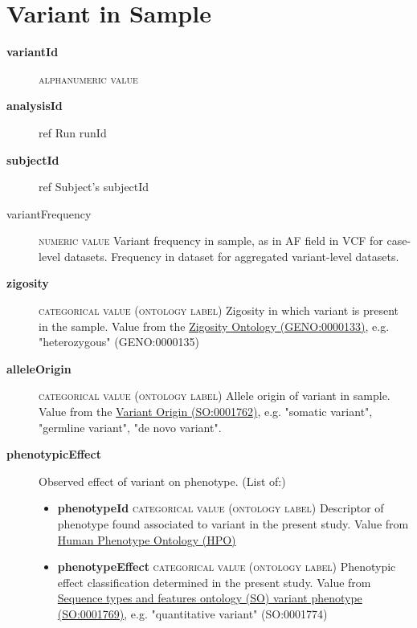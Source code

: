 \documentclass[a4paper, 10pt]{article}        %
\begin{document}
 
 
   \section*{ {\color{teal} Variant in Sample}}
  
  \begin{description}
  	\item[\textbf{variantId}]  {\textsc{alphanumeric value}} 
	\item[\textbf{analysisId}] ref Run runId
	\item[\textbf{subjectId}] ref Subject's subjectId
	\item[variantFrequency] {\textsc{numeric value}} Variant frequency in sample, as in AF field in VCF for case-level datasets. Frequency in dataset for aggregated variant-level datasets.
	\item[\textbf{zigosity}] {\textsc{categorical value (ontology label)}} Zigosity in which variant is present in the sample. Value from the \href{https://github.com/monarch-initiative/GENO-ontology/}{Zigosity Ontology (GENO:0000133)}, e.g. "heterozygous" (GENO:0000135)
	\item[\textbf{alleleOrigin}] {\textsc{categorical value (ontology label)}} Allele origin of variant in sample. Value from the \href{http://purl.obolibrary.org/obo/SO_0001762}{Variant Origin (SO:0001762)}, e.g. "somatic variant", "germline variant", "de novo variant". %
	\item[\textbf{phenotypicEffect}] Observed effect of variant on phenotype. (List of:)
	\begin{itemize}
				\item[] \textbf{phenotypeId} {\textsc{categorical value (ontology label)}} Descriptor of phenotype found associated to variant in the present study. Value from \href{http:purl.obolibrary.org/obo/HP_0000001}{Human Phenotype Ontology (HPO)}
				\item[] \textbf{phenotypeEffect} {\textsc{categorical value (ontology label)}} Phenotypic effect classification determined in the present study. Value from \href{http://purl/obolibrary.org/obo/SO_0001769}{Sequence types and features ontology (SO) variant phenotype (SO:0001769)}, e.g. "quantitative variant" (SO:0001774)

\end{itemize}
\end{description}
\end{document}
